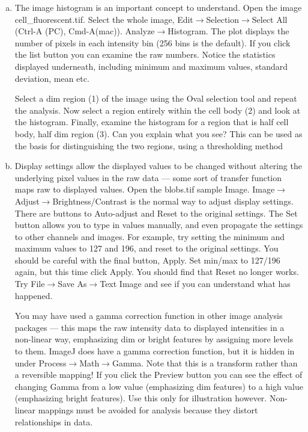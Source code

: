 \documentclass[a4paper,oneside,article]{memoir}
\begin{document}
    \begin{enumerate}[(a)]
      \item The image histogram is an important concept to understand.
      Open the image cell\_fluorescent.tif. Select the whole image,
      Edit$\rightarrow$Selection$\rightarrow$Select All (Ctrl-A (PC),
      Cmd-A(mac)). Analyze$\rightarrow$Histogram. The plot displays
      the number of pixels in each intensity bin (256 bins is the
      default). If you click the list button you can examine the raw
      numbers. Notice the statistics displayed underneath, including
      minimum and maximum values, standard deviation, mean etc.

      Select a dim region (1) of the image using the Oval selection
      tool and repeat the analysis. Now select a region entirely within
      the cell body (2) and look at the histogram. Finally, examine the
      histogram for a region that is half cell body, half dim region (3).
      Can you explain what you see? This can be used as the basis for
      distinguishing the two regions, using a thresholding method

      \item Display settings allow the displayed values to be changed
      without altering the underlying pixel values in the raw data
      --- some sort of transfer function maps raw to displayed values.
      Open the blobs.tif sample Image.
      Image$\rightarrow$Adjust$\rightarrow$Brightness/Contrast is the
      normal way to adjust display settings. There are buttons to
      Auto-adjust and Reset to the original settings. The Set button
      allows you to type in values manually, and even propagate the
      settings to other channels and images. For example, try setting
      the minimum and maximum values to 127 and 196, and reset to the
      original settings. You should be careful with the final button,
      Apply. Set min/max to 127/196 again, but this time click Apply.
      You should find that Reset no longer works. Try
      File$\rightarrow$Save As$\rightarrow$Text Image and see if you
      can understand what has happened.

      You may have used a gamma correction function in other image
      analysis packages --- this maps the raw intensity data to
      displayed intensities in a non-linear way, emphasizing dim or
      bright features by assigning more levels to them. ImageJ does
      have a gamma correction function, but it is hidden in under
      Process$\rightarrow$Math$\rightarrow$Gamma. Note that this is a
      transform rather than a reversible mapping! If you click the
      Preview button you can see the effect of changing Gamma from a
      low value (emphasizing dim features) to a high value (emphasizing
      bright features). Use this only for illustration however.
      Non-linear mappings must be avoided for analysis because they
      distort relationships in data.


\end{enumerate}
\end{document}
